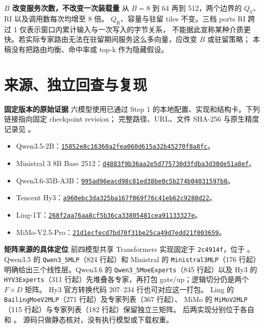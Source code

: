 \documentclass[11pt,a4paper,fontset=fandol]{ctexart}
\newcommand{\qs}{Q_{\mathrm S}}
\newcommand{\qr}{Q_{\mathrm R}}
\newcommand{\para}[1]{\par\smallskip\noindent\textbf{#1}\quad}
\begin{document}
\para{$B$ 改变服务次数，不改变一次装载量}
从 $B=8$ 到 64 再到 512，两个边界的 $\qs$、RI 以及调用数每次均增至 8 倍。
$\qr$、容量与驻留 tiles 不变。三档 ports RI 跨过 1 仅表示窗口内累计输入与一次写入的字节关系，
不能据此宣称某种介质更快。若实际专家路由无法在驻留期间服务这么多向量，应改变 $B$ 或驻留策略；
本稿没有把路由均衡、命中率或 top-k 作为隐藏假设。

\clearpage
\section{来源、独立回查与复现}
\para{固定版本的原始证据}
六模型使用已通过 Step 1 的本地配置、实现和结构卡。下列链接指向固定 checkpoint revision；
完整路径、URL、文件 SHA-256 与原生精度记录见 。
\begin{itemize}\small
\item Qwen3.5-2B：\href{https://huggingface.co/Qwen/Qwen3.5-2B/tree/15852e8c16360a2fea060d615a32b45270f8a8fc}{\texttt{15852e8c16360a2fea060d615a32b45270f8a8fc}}。
\item Ministral 3 8B Base 2512：\href{https://huggingface.co/mistralai/Ministral-3-8B-Base-2512/tree/d4883f9b36aa2e5d775730d3fdba3d30de51a8ef}{\texttt{d4883f9b36aa2e5d775730d3fdba3d30de51a8ef}}。
\item Qwen3.6-35B-A3B：\href{https://huggingface.co/Qwen/Qwen3.6-35B-A3B/tree/995ad96eacd98c81ed38be0c5b274b04031597b0}{\texttt{995ad96eacd98c81ed38be0c5b274b04031597b0}}。
\item Tencent Hy3：\href{https://huggingface.co/tencent/Hy3/tree/a960ebc3da325ba167f069f76c41eb62c9280d22}{\texttt{a960ebc3da325ba167f069f76c41eb62c9280d22}}。
\item Ling-1T：\href{https://huggingface.co/inclusionAI/Ling-1T/tree/268f2aa76aa8cf5b36ca33805481cea91133327e}{\texttt{268f2aa76aa8cf5b36ca33805481cea91133327e}}。
\item MiMo-V2.5-Pro：\href{https://huggingface.co/XiaomiMiMo/MiMo-V2.5-Pro/tree/21d1ecfecd7bd70f31be25ca49d7edd21f003659}{\texttt{21d1ecfecd7bd70f31be25ca49d7edd21f003659}}。
\end{itemize}\normalsize
\para{矩阵来源的具体定位}
前四模型共享 Transformers 实现固定于 \texttt{2c4914f}，位于
。
Qwen3.5 的 \texttt{Qwen3\_5MLP}（824 行起）和 Ministral 的 \texttt{Ministral3MLP}（176 行起）
明确给出三个线性层。Qwen3.6 的 \texttt{Qwen3\_5MoeExperts}（845 行起）以及
Hy3 的 \texttt{HYV3Experts}（311 行起）先堆叠各专家，再打包 gate/up；逻辑切分仍是两个 $F\times D$ 矩阵。
Hy3 官方转换代码 207--234 行也可对应这一打包。
Ling 的 \texttt{BailingMoeV2MLP}（271 行起）及专家列表（367 行起）、
MiMo 的 \texttt{MiMoV2MLP}（115 行起）与专家列表（182 行起）保留独立三矩阵。
后两实现分别位于各自  和 。
源码只做静态核对，没有执行模型或下载权重。
\end{document}
